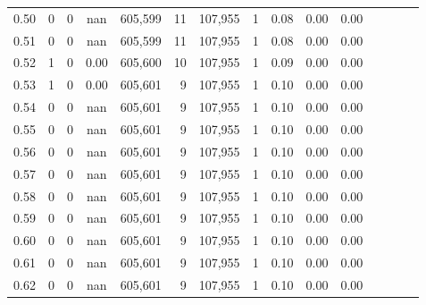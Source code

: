 \begin{tabular}{rrrcrrrrrrrrrrr}
0.50 &        0 &       0 &                                        nan &  605,599 &       11 &  107,955 &        1 &  0.08 &  0.00 &                         0.00 \\
0.51 &        0 &       0 &                                        nan &  605,599 &       11 &  107,955 &        1 &  0.08 &  0.00 &                         0.00 \\
0.52 &        1 &       0 &                                       0.00 &  605,600 &       10 &  107,955 &        1 &  0.09 &  0.00 &                         0.00 \\
0.53 &        1 &       0 &                                       0.00 &  605,601 &        9 &  107,955 &        1 &  0.10 &  0.00 &                         0.00 \\
0.54 &        0 &       0 &                                        nan &  605,601 &        9 &  107,955 &        1 &  0.10 &  0.00 &                         0.00 \\
0.55 &        0 &       0 &                                        nan &  605,601 &        9 &  107,955 &        1 &  0.10 &  0.00 &                         0.00 \\
0.56 &        0 &       0 &                                        nan &  605,601 &        9 &  107,955 &        1 &  0.10 &  0.00 &                         0.00 \\
0.57 &        0 &       0 &                                        nan &  605,601 &        9 &  107,955 &        1 &  0.10 &  0.00 &                         0.00 \\
0.58 &        0 &       0 &                                        nan &  605,601 &        9 &  107,955 &        1 &  0.10 &  0.00 &                         0.00 \\
0.59 &        0 &       0 &                                        nan &  605,601 &        9 &  107,955 &        1 &  0.10 &  0.00 &                         0.00 \\
0.60 &        0 &       0 &                                        nan &  605,601 &        9 &  107,955 &        1 &  0.10 &  0.00 &                         0.00 \\
0.61 &        0 &       0 &                                        nan &  605,601 &        9 &  107,955 &        1 &  0.10 &  0.00 &                         0.00 \\
0.62 &        0 &       0 &                                        nan &  605,601 &        9 &  107,955 &        1 &  0.10 &  0.00 &                         0.00 \\

\end{tabular}

